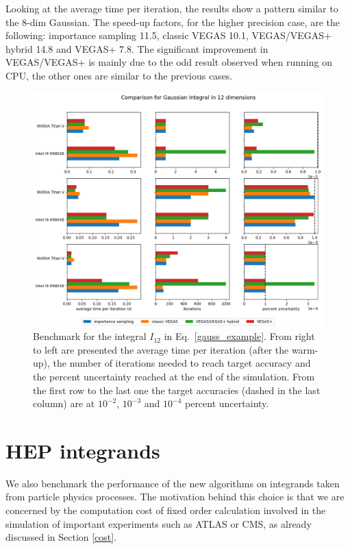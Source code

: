 \documentclass[../main/main.tex]{subfiles}
\begin{document}
Looking at the average time per iteration, the results show a pattern similar to the 8-dim Gaussian. The speed-up factors, for the higher precision case, are the following: importance sampling 11.5, classic VEGAS 10.1, VEGAS/VEGAS+ hybrid 14.8 and VEGAS+ 7.8.
The significant improvement in VEGAS/VEGAS+ is mainly due to the odd result observed when running on CPU, the other ones are similar to the previous cases.

\begin{figure}
	\centering
	\includegraphics[width=\textwidth]{../images/gauss12d_final.png}
	\caption{Benchmark  for the integral $I_{12}$ in Eq.~\ref{gauss_example}. From right to left are presented the average time per iteration (after the warm-up), the number of iterations needed to reach target accuracy and the percent uncertainty reached at the end of the simulation. From the first row to the last one the target accuracies (dashed in the last column) are at $10^{-2}$, $10^{-3}$ and $10^{-4}$ percent uncertainty.}
	\label{gauss12d}
\end{figure}


\section{HEP integrands}
We also benchmark the performance of the new algorithms on integrands taken from particle physics processes.
The motivation behind this choice is that we are concerned by the computation cost of fixed order calculation involved in the simulation
of important experiments such as ATLAS or CMS, as already discussed in Section \ref{cost}.
\end{document}
